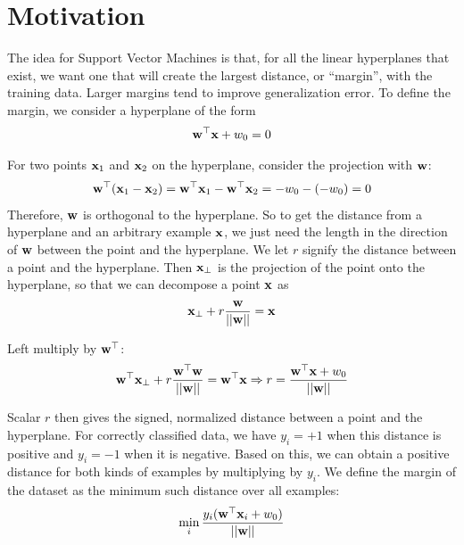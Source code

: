 \documentclass[11pt,letterpaper]{article}
\begin{document}

\section{Motivation}
The idea for Support Vector Machines is that, for all the linear hyperplanes that exist, we want one that will create the largest distance, or ``margin'', with the training data. Larger margins tend to improve generalization error. To define the margin, we consider a hyperplane of the form
$$\mathbf{w}^\top \mathbf{x} + w_0 = 0$$

\noindent{}

\medskip 

\noindent For two points $\mathbf{x}_1$ and $\mathbf{x}_2$ on the hyperplane, consider the projection with $\mathbf{w}$:
$$\mathbf{w}^\top(\mathbf{x}_1 - \mathbf{x}_2) = \mathbf{w}^\top\mathbf{x}_1 - \mathbf{w}^\top\mathbf{x}_2 = -w_0 -(-w_0) = 0$$
Therefore, $\mathbf{w}$ is orthogonal to the hyperplane. So to get the distance from a hyperplane and an arbitrary example $\mathbf{x}$, we just need the length
in the direction of $\mathbf{w}$ between the point and the hyperplane. We let $r$ signify the distance between a point and the hyperplane. Then $\mathbf{x}_{\perp}$ is the projection of the point onto the hyperplane,
so that we can decompose a point $\mathbf{x}$ as
%
$$
\mathbf{x}_{\perp}+r\frac{\mathbf{w}}{||\mathbf{w}||} = \mathbf{x}
$$

\noindent Left multiply by $\bold w^\top$:
$$
\mathbf{w}^\top\mathbf{x}_{\perp} + r\frac{\mathbf{w}^\top\mathbf{w}}{||\mathbf{w}||} = \mathbf{w}^\top\mathbf{x} \Rightarrow r = \frac{\mathbf{w}^\top\mathbf{x}+w_0}{||\mathbf{w}||}
$$

\noindent Scalar $r$ then gives the signed, normalized distance between a point and the hyperplane.
For correctly classified data, we have $y_i=+1$ when this distance is
positive and $y_i=-1$ when it is negative. Based on this,
we can obtain a positive distance for both kinds of examples
by multiplying by $y_i$. We define the margin of the dataset as the minimum such
distance over all examples:
%
$$\min_{i} \frac{y_i(\mathbf{w}^\top\mathbf{x}_i + w_0)}{||\mathbf{w}||}$$
\end{document}
